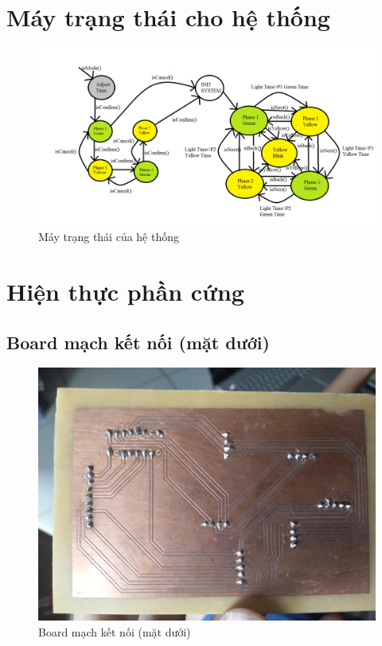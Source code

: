 \documentclass[a4paper]{article}
\begin{document}
\section{Máy trạng thái cho hệ thống}
\begin{figure}[H]
\begin{center}
\includegraphics[width=17cm]{pic6.png}
\caption{Máy trạng thái của hệ thống}
\end{center}
\end{figure}

\section{Hiện thực phần cứng}
\subsection{Board mạch kết nối (mặt dưới)}
\begin{figure}[H]
\begin{center}
\includegraphics[width=14cm]{pic8.jpg}
\caption{Board mạch kết nối (mặt dưới)}
\end{center}
\end{figure}
\end{document}
